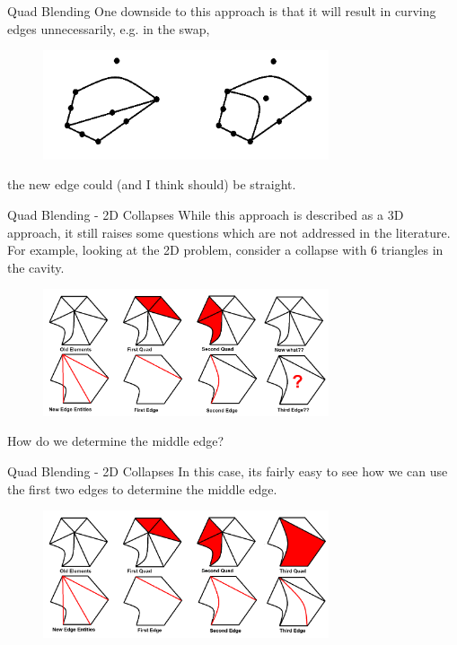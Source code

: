 \documentclass[12pt]{beamer}
\begin{document}
\begin{frame}{Quad Blending}
 One downside to this approach is that it will result in curving edges unnecessarily, e.g. in the swap,
\begin{figure}
  \centering
  \includegraphics[width=0.75\textwidth]{bezier_images/swap3.png} 
\end{figure}
the new edge could (and I think should) be straight.
\end{frame}
\begin{frame}{Quad Blending - 2D Collapses}
While this approach is described as a 3D approach, it still raises some questions which are not addressed in the literature. For example, looking at the 2D problem, consider a collapse with 6 triangles in the cavity.
\begin{figure}
  \centering
  \includegraphics[width=0.75\textwidth]{bezier_images/collapse9.png} 
\end{figure}
How do we determine the middle edge?
\end{frame}
\begin{frame}{Quad Blending - 2D Collapses}
In this case, its fairly easy to see how we can use the first two edges to determine the middle edge.
\begin{figure}
  \centering
  \includegraphics[width=0.75\textwidth]{bezier_images/collapse10.png} 
\end{figure}

\end{frame}
\end{document}
